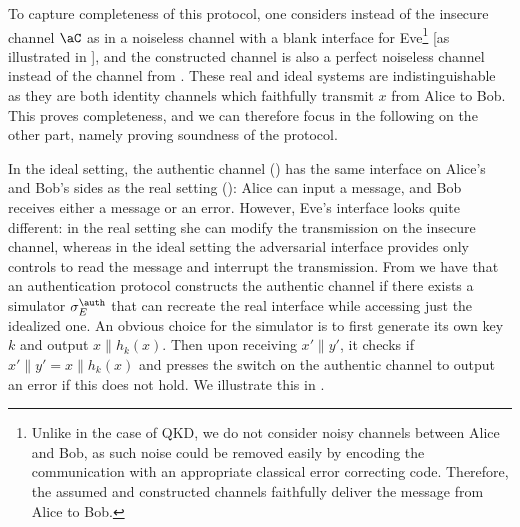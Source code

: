 To capture completeness of this protocol, one considers instead of the insecure channel $\aC$ as in
 a noiseless channel with a
blank interface for Eve\footnote{Unlike in the case of QKD, we do not
  consider noisy channels between Alice and Bob, as such noise could
  be removed easily by encoding the communication with an appropriate classical error
  correcting code. Therefore, the assumed and constructed channels
  faithfully deliver the message from Alice to Bob.}  [as illustrated
in ], and the constructed
channel is also a perfect noiseless channel instead of the channel
from . These real and ideal systems are
indistinguishable as they are both identity channels which faithfully
transmit $x$ from Alice to Bob. This proves completeness, and we can therefore focus in the
following on the other part, namely proving soundness of the protocol.

In the ideal setting, the authentic channel
() has the same interface on Alice's and
Bob's sides as the real setting (): Alice can
input a message, and Bob receives either a message or an
error. However, Eve's interface looks quite different: in the real
setting she can modify the transmission on the insecure channel,
whereas in the ideal setting the adversarial interface provides only
controls to read the message and interrupt the transmission. From
 we have that an authentication protocol
constructs the authentic channel if there exists a simulator
$\sigma^{\auth}_E$ that can recreate the real interface while
accessing just the idealized one. An obvious choice for the simulator
is to first generate its own key $k$ and output $x \| h_k(x)$. Then
upon receiving $x' \| y'$, it checks if $x' \| y' = x \| h_k(x)$ and
presses the switch on the authentic channel to output an error if this
does not hold. We illustrate this in .

